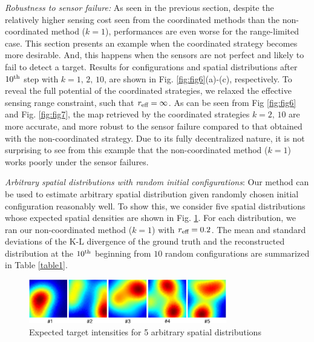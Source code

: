 \documentclass[letterpaper, 10 pt, conference]{ieeeconf}
\begin{document}
\textit{Robustness to sensor failure:}
As seen in the previous section, 
despite the relatively higher sensing cost seen from the coordinated methods than the non-coordinated method ($k=1$), performances are even worse for the range-limited case.
This section presents an example when the coordinated strategy becomes more desirable. And, this happens when the sensors are not perfect and likely to fail to detect a target. 
Results for configurations and spatial distributions after $10^{\textup{th}}$ step with $k=1,\,2,\,10$, are shown in Fig. \ref{fig:fig6}(a)-(c), respectively. To reveal the full potential of the coordinated strategies, we relaxed the effective sensing range constraint, such that $r_{\textup{eff}} = \infty$.
As can be seen from Fig \ref{fig:fig6} and Fig. \ref{fig:fig7}, the map retrieved by the coordinated strategies $k=2,\,10$ are more accurate, and more robust to the sensor failure compared to that obtained with the non-coordinated strategy. 
Due to its fully decentralized nature, it is not surprising to see from this example that the non-coordinated method ($k=1$) works poorly under the sensor failures. 

\textit{Arbitrary spatial distributions with random initial configurations}:
Our method can be used to estimate arbitrary spatial distribution given randomly chosen initial configuration reasonably well. To show this, we consider five spatial distributions whose expected spatial densities are shown in Fig. \ref{fig:fig8}. 
For each distribution, we ran our non-coordinated method ($k=1$) with $r_{\textup{eff}} = 0.2$. 
The mean and standard deviations of the K-L divergence of the ground truth and the reconstructed distribution at the $10^{\textup{th}}$ beginning from $10$ random configurations are summarized in Table \ref{table1}.
\begin{figure}
	\centering
	\includegraphics[width=3.4in]{figure/fig8}
	\caption{Expected target intensities for 5 arbitrary spatial distributions} 
	\label{fig:fig8}
\end{figure}

\begin{table}[]
	\centering
	\caption{Mean and standard deviations (parenthesis) of K-L divergence for  arbitrary distributions (Fig. \ref{fig:fig8}) under 10 random initial configurations}
	\label{table1}
			{\scriptsize
	}
\end{table}
\end{document}
